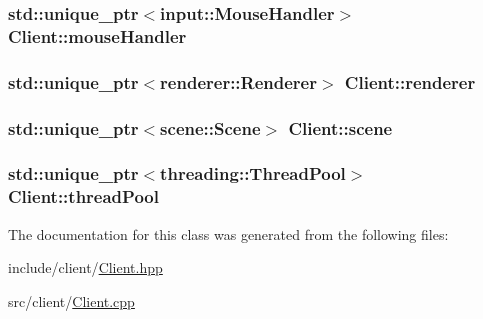 \hypertarget{classClient_af554443b807f1ea3f63970efe51a4b65}{
\subsubsection[{mouse\-Handler}]{\setlength{\rightskip}{0pt plus 5cm}std\-::unique\-\_\-ptr$<${\bf input\-::\-Mouse\-Handler}$>$ Client\-::mouse\-Handler}}\label{classClient_af554443b807f1ea3f63970efe51a4b65}
\hypertarget{classClient_a86f232e1c10bf55bb1512814de486c3a}{
\subsubsection[{renderer}]{\setlength{\rightskip}{0pt plus 5cm}std\-::unique\-\_\-ptr$<${\bf renderer\-::\-Renderer}$>$ Client\-::renderer}}\label{classClient_a86f232e1c10bf55bb1512814de486c3a}
\hypertarget{classClient_af8d1678588c945262a77bddf81fe432d}{
\subsubsection[{scene}]{\setlength{\rightskip}{0pt plus 5cm}std\-::unique\-\_\-ptr$<${\bf scene\-::\-Scene}$>$ Client\-::scene}}\label{classClient_af8d1678588c945262a77bddf81fe432d}
\hypertarget{classClient_a91d160a7044d37dd6ae7e74044989352}{
\subsubsection[{thread\-Pool}]{\setlength{\rightskip}{0pt plus 5cm}std\-::unique\-\_\-ptr$<${\bf threading\-::\-Thread\-Pool}$>$ Client\-::thread\-Pool}}\label{classClient_a91d160a7044d37dd6ae7e74044989352}


The documentation for this class was generated from the following files\-:\begin{DoxyCompactItemize}
\item 
include/client/\hyperlink{Client_8hpp}{Client.\-hpp}\item 
src/client/\hyperlink{Client_8cpp}{Client.\-cpp}\end{DoxyCompactItemize}
